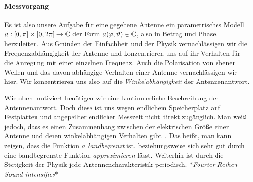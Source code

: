 \paragraph{Messvorgang}
%
%
Es ist also unsere Aufgabe f\"ur eine gegebene Antenne ein parametrisches Modell $a: [0, \pi] \times [0, 2\pi] \rightarrow \mathbb{C}$ der Form $a(\varphi, \vartheta) \in \mathbb{C}$, also in Betrag und Phase, herzuleiten.
Aus Gr\"unden der Einfachheit und der Physik vernachl\"assigen wir die Frequenzabh\"angigkeit der Antenne und konzentrieren uns auf ihr Verhalten f\"ur die Anregung mit einer einzelnen Frequenz.
Auch die Polarisation von ebenen Wellen und das davon abh\"angige Verhalten einer Antenne vernachl\"assigen wir hier.
Wir konzentrieren uns also auf die \emph{Winkelabh\"angigkeit} der Antennenantwort.

Wie oben motiviert ben\"otigen wir eine kontinuierliche Beschreibung der Antennenantwort.
Doch diese ist uns wegen endlichem Speicherplatz auf Festplatten und angepeilter endlicher Messzeit nicht direkt zug\"anglich.
Man wei{\ss} jedoch, dass es einen Zusammenhang zwischen der elektrischen Gr\"o{\ss}e einer Antenne und deren winkelabh\"angigen Verhalten gibt~\cite[Kapitel~4]{delgaldo2007phd}.
Das hei{\ss}t, man kann zeigen, dass die Funktion $a$ \emph{bandbegrenzt} ist, beziehungsweise sich sehr gut durch eine bandbegrenzte Funktion \emph{approximieren} l\"asst.
Weiterhin ist durch die Stetigkeit der Physik jede Antennencharakteristik periodisch.
\emph{$\ast$Fourier-Reihen-Sound intensifies$\ast$}

